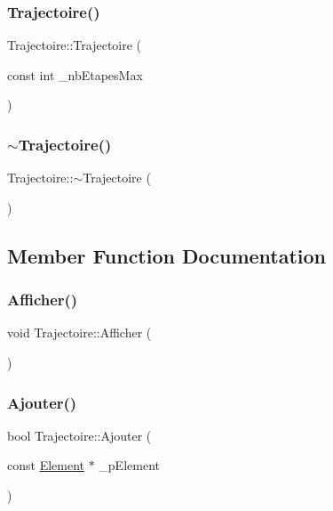 \subsubsection{\texorpdfstring{Trajectoire()}{Trajectoire()}}
{\footnotesize\ttfamily Trajectoire\+::\+Trajectoire (\begin{DoxyParamCaption}\item[{const int}]{\+\_\+nb\+Etapes\+Max }\end{DoxyParamCaption})}

\mbox{\label{class_trajectoire_a9249a7bd01726684494eeea9fde54b9e}} 
\subsubsection{\texorpdfstring{$\sim$\+Trajectoire()}{~Trajectoire()}}
{\footnotesize\ttfamily Trajectoire\+::$\sim$\+Trajectoire (\begin{DoxyParamCaption}{ }\end{DoxyParamCaption})}



\subsection{Member Function Documentation}
\mbox{\label{class_trajectoire_ab2ab026cbcf416f397ff6ee7f8331cc4}} 
\subsubsection{\texorpdfstring{Afficher()}{Afficher()}}
{\footnotesize\ttfamily void Trajectoire\+::\+Afficher (\begin{DoxyParamCaption}{ }\end{DoxyParamCaption})}

\mbox{\label{class_trajectoire_a12ae44f39805bb480c2f8bf3454ea342}} 
\subsubsection{\texorpdfstring{Ajouter()}{Ajouter()}}
{\footnotesize\ttfamily bool Trajectoire\+::\+Ajouter (\begin{DoxyParamCaption}\item[{const \hyperlink{class_element}{Element} $\ast$}]{\+\_\+p\+Element }\end{DoxyParamCaption})}




